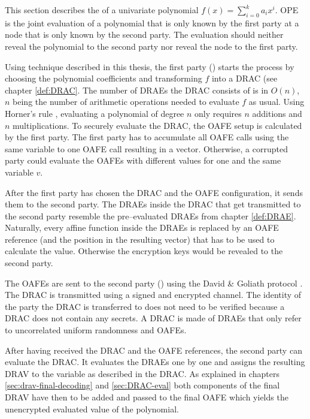 %
%
\label{sec:OPE}

This section describes the  of a
univariate polynomial $f(x) = \sum_{i=0}^k a_ix^i$. OPE is the joint evaluation
of a polynomial that is only known by the first party at a node that is only
known by the second party. The evaluation should neither reveal the polynomial
to the second party nor reveal the node to the first party.

Using technique described in this thesis, the first party (\JWpOne{}) starts the
process by choosing the polynomial coefficients and transforming  $f$ into a
DRAC (see chapter \ref{def:DRAC}. The number of DRAEs the DRAC consists of is in
$O(n)$, $n$ being the number of arithmetic operations needed to evaluate $f$ as
usual. Using Horner's rule \cite{cormen01}, evaluating a polynomial of degree
$n$ only requires $n$ additions and $n$ multiplications. To securely evaluate
the DRAC, the OAFE setup is calculated by the first party. The first party has
to accumulate all OAFE calls using the same variable to one OAFE call resulting
in a vector. Otherwise, a corrupted party could evaluate the OAFEs with
different values for one and the same variable $v$.

After the first party has chosen the DRAC and the OAFE configuration, it sends
them to the second party. The DRAEs inside the DRAC that get transmitted to the
second party resemble the pre--evaluated DRAEs from chapter \ref{def:DRAE}.
Naturally, every affine function inside the DRAEs is replaced by an OAFE
reference (and the position in the resulting vector) that has to be used to
calculate the value. Otherwise the encryption keys would be revealed to the
second party.

The OAFEs are sent to the second party (\JWpTwo{}) using the David \& Goliath
protocol \cite{davidgoliath}. The DRAC is transmitted using a signed and
encrypted channel. The identity of the party the DRAC is transferred to does not
need to be verified because a DRAC does not contain any secrets. A DRAC is made
of DRAEs that only refer to uncorrelated uniform randomness and OAFEs.

After having received the DRAC and the OAFE references, the second party can
evaluate the DRAC\@. It evaluates the DRAEs one by one and assigns the resulting
DRAV to the variable as described in the DRAC\@. As explained in chapters
\ref{sec:drav-final-decoding} and \ref{sec:DRAC-eval} both components of the
final DRAV have then to be added and passed to the final OAFE which yields the
unencrypted evaluated value of the polynomial.


